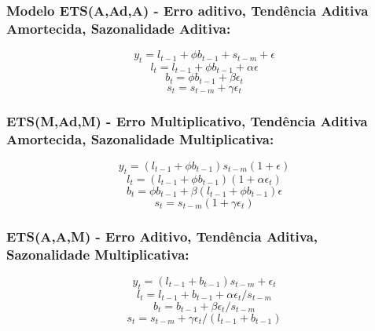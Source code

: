 \documentclass[a4paper, 12pt]{article}
\begin{document}
\subsubsection{Modelo ETS(A,Ad,A) - Erro aditivo, Tendência Aditiva Amortecida, Sazonalidade Aditiva:}

    \begin{equation*}
        y_t = l_{t-1} + \phi b_{t-1} + s_{t-m} + \epsilon
    \end{equation*}
    \begin{equation*}
        l_t = l_{t-1} + \phi b_{t-1} + \alpha \epsilon
    \end{equation*}
    \begin{equation*}
        b_t = \phi b_{t-1} + \beta \epsilon_t
    \end{equation*}
    \begin{equation*}
        s_t = s_{t-m} + \gamma \epsilon_t
    \end{equation*}



\subsubsection{ETS(M,Ad,M) - Erro Multiplicativo, Tendência Aditiva Amortecida, Sazonalidade Multiplicativa:}

    \begin{equation*}
        y_t = (l_{t-1} + \phi b_{t-1})s_{t-m}(1+\epsilon)
    \end{equation*}
    \begin{equation*}
        l_t = (l_{t-1} + \phi b_{t-1})(1+\alpha \epsilon_t)
    \end{equation*}
    \begin{equation*}
        b_t = \phi b_{t-1} + \beta(l_{t-1} + \phi b_{t-1}) \epsilon
    \end{equation*}
    \begin{equation*}
        s_t = s_{t-m} (1+ \gamma \epsilon_t)
    \end{equation*}

\subsubsection{ETS(A,A,M) - Erro Aditivo, Tendência Aditiva, Sazonalidade Multiplicativa:}

    \begin{equation*}
        y_t = (l_{t-1} + b_{t-1})s_{t-m} + \epsilon_t
    \end{equation*}
    \begin{equation*}
        l_t = l_{t-1} + b_{t-1} + \alpha \epsilon_t/s_{t-m}
    \end{equation*}
    \begin{equation*}
        b_t = b_{t-1} + \beta \epsilon_t / s_{t-m}
    \end{equation*}
    \begin{equation*}
        s_t = s_{t-m} + \gamma \epsilon_t / (l_{t-1} + b_{t-1})
    \end{equation*}
\end{document}
